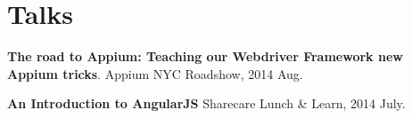 \section{Talks}
%
\begin{position}
  \item[] \textbf{The road to Appium: Teaching our Webdriver Framework new Appium tricks}. Appium NYC Roadshow, 2014 Aug.
  \item[] \textbf{An Introduction to AngularJS} Sharecare Lunch \& Learn, 2014 July.
\end{position}
